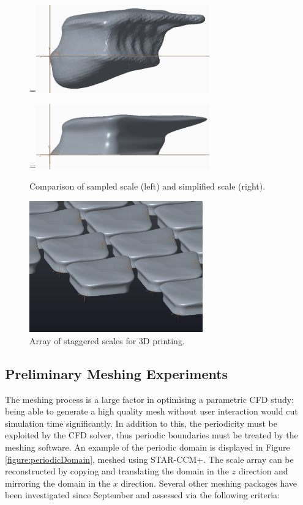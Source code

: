 \documentclass[12pt,oneside,a4paper]{article}
\newcommand*{\vcenteredhbox}[1]{\begingroup
\setbox0=\hbox{#1}\parbox{\wd0}{\box0}\endgroup}
\begin{document}
\begin{figure}[!t]
\\
\vspace{2.5cm}
\vcenteredhbox{\includegraphics[width=7.5cm]{images/Scale_Replication_14.PNG}}\hfill
\vcenteredhbox{\includegraphics[width=7.5cm]{images/Scale_Replication_13.PNG}}
\caption{Comparison of sampled scale (left) and simplified scale (right).}
\label{figure:scaleComparison}
\end{figure}

\begin{figure}[!t]
\centering
\includegraphics[width=7.5cm]{images/array_progress_report.PNG}
\caption{Array of staggered scales for 3D printing.}
\label{figure:staggeredArray}
\end{figure}




\newpage
\subsection{Preliminary Meshing Experiments}
\label{section:meshing}
The meshing process is a large factor in optimising a parametric CFD study: being able to generate a high quality mesh without user interaction would cut simulation time significantly. In addition to this, the periodicity must be exploited by the CFD solver, thus periodic boundaries must be treated by the meshing software. An example of the periodic domain is displayed in Figure \ref{figure:periodicDomain}, meshed using STAR-CCM+. The scale array can be reconstructed by copying and translating the domain in the $z$ direction and mirroring the domain in the $x$ direction. Several other meshing packages have been investigated since September and assessed via the following criteria:
\end{document}
